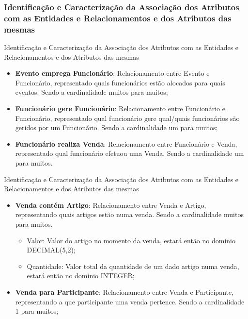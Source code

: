 \documentclass[compress,svgnames,handout,13.7pt]{beamer}
\begin{document}
\subsubsection{Identificação e Caracterização da Associação dos Atributos com as Entidades e Relacionamentos e dos Atributos das mesmas}
\begin{frame}{Identificação e Caracterização da Associação dos Atributos com as Entidades e Relacionamentos e dos Atributos das mesmas}
\begin{itemize}
                 \item{\textbf{Evento emprega Funcionário}:} Relacionamento entre Evento e Funcionário, representado quais funcionários estão alocados para quais eventos. Sendo a cardinalidade muitos para muitos;
                 \item{\textbf{Funcionário gere Funcionário}:} Relacionamento entre Funcionário e Funcionário, representado qual funcionário gere qual/quais funcionários são geridos por um Funcionário. Sendo a cardinalidade um para muitos;
                 \item{\textbf{Funcionário realiza Venda}:} Relacionamento entre Funcionário e Venda, representado qual funcionário efetuou uma Venda. Sendo a cardinalidade um para muitos.
\end{itemize}
\end{frame}
\begin{frame}{Identificação e Caracterização da Associação dos Atributos com as Entidades e Relacionamentos e dos Atributos das mesmas}
\begin{itemize}
                 \item{\textbf{Venda contém Artigo}:} Relacionamento entre Venda e Artigo, representando quais artigos estão numa venda. Sendo a cardinalidade muitos para muitos.
                     \begin{itemize}
                     \item{Valor:} Valor do artigo no momento da venda, estará então no domínio DECIMAL(5,2);
                       
                     \item{Quantidade:} Valor total da quantidade de um dado artigo numa venda, estará então no domínio INTEGER;
                       
                     \end{itemize}
                 \item{\textbf{Venda para Participante}:} Relacionamento entre Venda e Participante, representando a que participante uma venda pertence. Sendo a cardinalidade 1 para muitos;
\end{itemize}
\end{frame}
\end{document}
